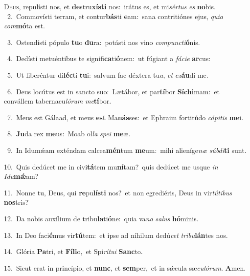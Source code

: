 \lettrine{\initial\textcolor{\initialcolor}{D}}{eus,} repulísti nos, et \textbf{de}\-stru\-\textbf{xís}\-\textbf{ti} nos:~\star irátus es, et mi\-\textit{sér}\-\textit{tus} \textit{es} \textbf{no}\-bis.\\
{\numbfont\textcolor{\numbcolor}{~2.}}~Commovísti terram, et contur\-\textbf{bás}\-ti \textbf{e}\-am:~\star sana contritiónes ejus, \textit{qui}\-\textit{a} \textit{com}\-\textbf{mó}ta est.\par
{\numbfont\textcolor{\numbcolor}{~3.}}~Ostendísti pópulo \textbf{tu}\-o \textbf{du}\-ra:~\star potásti nos vino \textit{com}\-\textit{punc}\textit{ti}\textbf{ó}nis.\par
{\numbfont\textcolor{\numbcolor}{~4.}}~Dedísti metuéntibus te signifi\-\textbf{ca}\-ti\-\textbf{ó}\-nem:~\star ut fúgiant a \textit{fá}\-\textit{ci}\textit{e} \textbf{ar}\-cus:\par
{\numbfont\textcolor{\numbcolor}{~5.}}~Ut liberéntur di\-\textbf{léc}\-ti \textbf{tu}\-i:~\star salvum fac déxtera tu\-\textit{a}\-, \textit{et} \textit{ex}\-\textbf{áu}di me.\par
{\numbfont\textcolor{\numbcolor}{~6.}}~Deus locútus est in sancto suo:~\dagger Lætábor, et par\-\textbf{tí}\-bor \textbf{Sí}\-\textbf{chi}mam:~\star et convállem tabernacu\-\textit{ló}\-\textit{rum} \textit{me}\-\textbf{tí}bor.\par
{\numbfont\textcolor{\numbcolor}{~7.}}~Meus est Gálaad, et meus \textbf{est} Ma\-\textbf{nás}\-ses:~\star et Ephraim fortitúdo \textit{cá}\-\textit{pi}\textit{tis} \textbf{me}\-i.\par
{\numbfont\textcolor{\numbcolor}{~8.}}~\-\textbf{Ju}\-da rex \textbf{me}\-us:~\star Moab ol\textit{la} \textit{spe}\-\textit{i} \textbf{me}\-æ.\par
{\numbfont\textcolor{\numbcolor}{~9.}}~In Idumǽam exténdam calcea\-\textbf{mén}\-tum \textbf{me}\-um:~\star mihi alieníge\textit{næ} \textit{súb}\-\textit{di}\textbf{ti} sunt.\par
{\numbfont\textcolor{\numbcolor}{10.}}~Quis dedúcet me in civi\-\textbf{tá}\-tem mu\-\textbf{ní}\-tam?~\star quis dedúcet me usque \textit{in} \textit{I}\-\textit{du}\textbf{mǽ}am?\par
{\numbfont\textcolor{\numbcolor}{11.}}~Nonne tu, Deus, qui \textbf{re}\-pu\-\textbf{lís}\-\textbf{ti} nos?~\star et non egrediéris, Deus in vir\-\textit{tú}\-\textit{ti}\textit{bus} \textbf{nos}\-tris?\par
{\numbfont\textcolor{\numbcolor}{12.}}~Da nobis auxílium de tribu\-\textbf{la}\-ti\-\textbf{ó}\-ne:~\star quia va\textit{na} \textit{sa}\-\textit{lus} \textbf{hó}\-minis.\par
{\numbfont\textcolor{\numbcolor}{13.}}~In Deo faci\-\textbf{é}\-mus vir\-\textbf{tú}\-tem:~\star et ipse ad níhilum dedú\textit{cet} \textit{tri}\-\textit{bu}\textbf{lán}tes nos.\par
{\numbfont\textcolor{\numbcolor}{14.}}~Glória \textbf{Pa}\-tri, et \textbf{Fí}\-\textbf{li}o,~\star et Spi\-\textit{rí}\-\textit{tu}\textit{i} \textbf{Sanc}\-to.\par
{\numbfont\textcolor{\numbcolor}{15.}}~Sicut erat in princípio, et \textbf{nunc}\-, et \textbf{sem}\-per,~\star et in sǽcula sæ\-\textit{cu}\-\textit{ló}\textit{rum}. \textbf{A}\-men.\par
